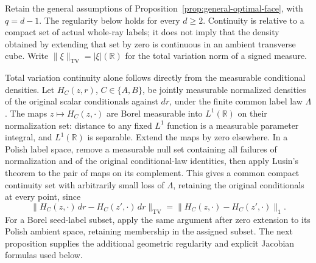 \documentclass[11pt,reqno]{amsart}
\theoremstyle{definition}
\theoremstyle{remark}
\numberwithin{equation}{section}
\newcommand{\R}{\mathbb R}
\begin{document}
Retain the general assumptions of
Proposition~\ref{prop:general-optimal-face}, with \(q=d-1\).
The regularity below holds for every \(d\ge2\). Continuity is relative
to a compact set of actual whole-ray labels; it does not imply that
the density obtained by extending that set by zero is continuous in
an ambient transverse cube. Write
\(\|\xi\|_{\mathrm{TV}}=|\xi|(\R)\) for the total variation norm
of a signed measure.

Total variation continuity alone follows directly from the measurable
conditional densities. Let \(H_C(z,r)\), \(C\in\{A,B\}\), be jointly
measurable normalized densities of the original scalar conditionals
against \(dr\), under the finite common label law \(\Lambda\).
The maps \(z\mapsto H_C(z,\cdot)\) are Borel measurable into
\(L^1(\R)\) on their normalization set: distance to any fixed
\(L^1\) function is a measurable parameter integral, and
\(L^1(\R)\) is separable. Extend the maps by zero elsewhere.
In a Polish label space, remove a measurable null set containing
all failures of normalization and of the original conditional-law
identities, then apply Lusin's theorem to the pair of maps on its
complement. This gives a common compact continuity set with
arbitrarily small loss of \(\Lambda\), retaining the original
conditionals at every point, since
\[
 \|H_C(z,\cdot)\,dr-H_C(z',\cdot)\,dr\|_{\mathrm{TV}}
   =\|H_C(z,\cdot)-H_C(z',\cdot)\|_1.
\]
For a Borel seed-label subset, apply the same argument after zero
extension to its Polish ambient space, retaining membership in the
assigned subset. The next proposition supplies the additional
geometric regularity and explicit Jacobian formulas used below.
\end{document}
